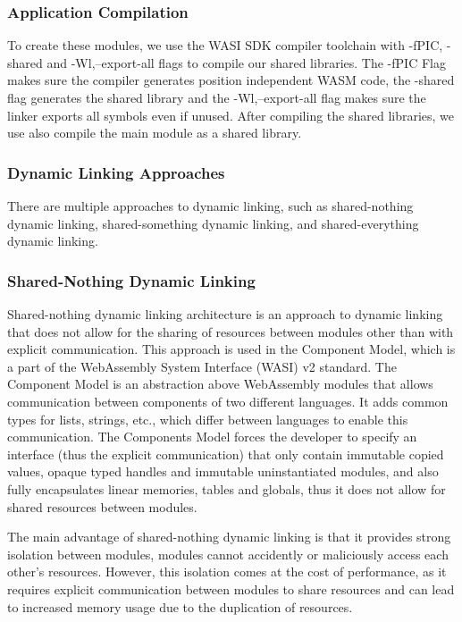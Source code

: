 \subsubsection{Application Compilation}
To create these modules, we use the WASI SDK compiler toolchain with -fPIC, -shared and -Wl,--export-all flags to compile our shared libraries.
The -fPIC Flag makes sure the compiler generates position independent WASM code, the -shared flag generates the shared library and the -Wl,--export-all flag makes sure the linker exports all symbols even if unused. After compiling the shared libraries, we use also compile the main module as a shared library.

\subsubsection {Dynamic Linking Approaches}
There are multiple approaches to dynamic linking, such as shared-nothing dynamic linking, shared-something dynamic linking, and shared-everything dynamic linking.

\subsubsection{Shared-Nothing Dynamic Linking}

Shared-nothing dynamic linking architecture is an approach to dynamic linking that does not allow for the sharing of resources between modules other than with explicit communication. This approach is used in the Component Model, which is a part of the WebAssembly System Interface (WASI) v2 standard. The Component Model is an abstraction above WebAssembly modules that allows communication between components of two different languages. It adds common types for lists, strings, etc., which differ between languages to enable this communication. The Components Model forces the developer to specify an interface (thus the explicit communication) that only contain immutable copied values, opaque typed handles and immutable uninstantiated modules, and also fully encapsulates linear memories, tables and globals, thus it does not allow for shared resources between modules.

The main advantage of shared-nothing dynamic linking is that it provides strong isolation between modules, modules cannot accidently or maliciously access each other's resources. However, this isolation comes at the cost of performance, as it requires explicit communication between modules to share resources and can lead to increased memory usage due to the duplication of resources.

